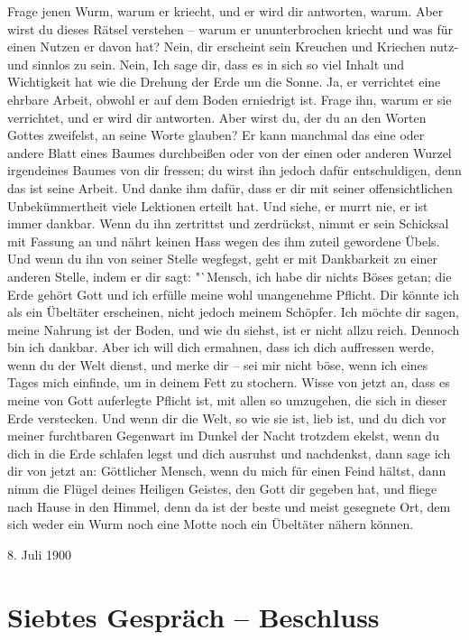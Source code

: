 Frage jenen Wurm, warum er kriecht, und er wird dir antworten, warum. Aber wirst du dieses Rätsel verstehen -- warum er ununterbrochen kriecht und was für einen Nutzen er davon hat? Nein, dir erscheint sein Kreuchen und Kriechen nutz- und sinnlos zu sein. Nein, Ich sage dir, dass es in sich so viel Inhalt und Wichtigkeit hat wie die Drehung der Erde um die Sonne. Ja, er verrichtet eine ehrbare Arbeit, obwohl er auf dem Boden erniedrigt ist. Frage ihn, warum er sie verrichtet, und er wird dir antworten. Aber wirst du, der du an den Worten Gottes zweifelst, an seine Worte glauben? Er kann manchmal das eine oder andere Blatt eines Baumes durchbeißen oder von der einen oder anderen Wurzel irgendeines Baumes von dir fressen; du wirst ihn jedoch dafür entschuldigen, denn das ist seine Arbeit. Und danke ihm dafür, dass er dir mit seiner offensichtlichen Unbekümmertheit viele Lektionen erteilt hat. Und siehe, er murrt nie, er ist immer dankbar. Wenn du ihn zertrittst und zerdrückst, nimmt er sein Schicksal mit Fassung an und nährt keinen Hass wegen des ihm zuteil gewordene Übels. Und wenn du ihn von seiner Stelle wegfegst, geht er mit Dankbarkeit zu einer anderen Stelle, indem er dir sagt: "`Mensch, ich habe dir nichts Böses getan; die Erde gehört Gott und ich erfülle meine wohl unangenehme Pflicht. Dir könnte ich als ein Übeltäter erscheinen, nicht jedoch meinem Schöpfer. Ich möchte dir sagen, meine Nahrung ist der Boden, und wie du siehst, ist er nicht allzu reich. Dennoch bin ich dankbar. Aber ich will dich ermahnen, dass ich dich auffressen werde, wenn du der Welt dienst, und merke dir -- sei mir nicht böse, wenn ich eines Tages mich einfinde, um in deinem Fett zu stochern. Wisse von jetzt an, dass es meine von Gott auferlegte Pflicht ist, mit allen so umzugehen, die sich in dieser Erde verstecken. Und wenn dir die Welt, so wie sie ist, lieb ist, und du dich vor meiner furchtbaren Gegenwart im Dunkel der Nacht trotzdem ekelst, wenn du dich in die Erde schlafen legst und dich ausruhst und nachdenkst, dann sage ich dir von jetzt an: Göttlicher Mensch, wenn du mich für einen Feind hältst, dann nimm die Flügel deines Heiligen Geistes, den Gott dir gegeben hat, und fliege nach Hause in den Himmel, denn da ist der beste und meist gesegnete Ort, dem sich weder ein Wurm noch eine Motte noch ein Übeltäter nähern können.


8. Juli 1900






\section{Siebtes Gespräch -- Beschluss}

